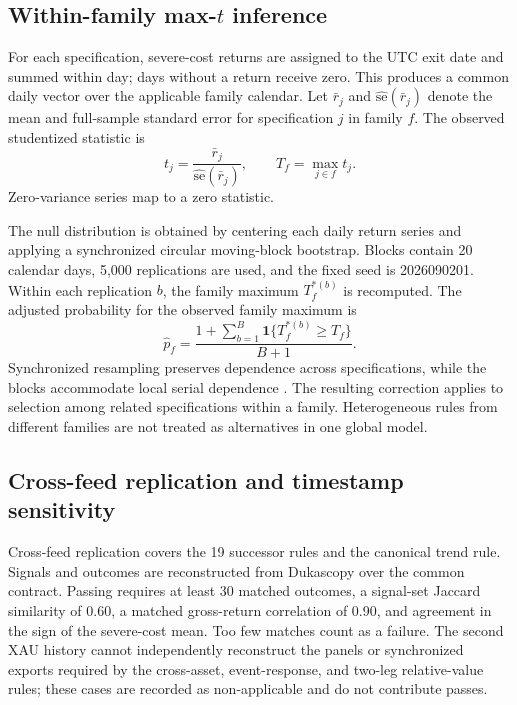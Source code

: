 \subsection{Within-family max-$t$ inference}\label{subsec:maxt}

For each specification, severe-cost returns are assigned to the UTC exit date and summed within day; days without a return receive zero. This produces a common daily vector over the applicable family calendar. Let $\bar r_j$ and $\widehat{\mathrm{se}}(\bar r_j)$ denote the mean and full-sample standard error for specification $j$ in family $f$. The observed studentized statistic is
\begin{equation}
 t_j=\frac{\bar r_j}{\widehat{\mathrm{se}}(\bar r_j)},\qquad
 T_f=\max_{j\in f}t_j.
\end{equation}
Zero-variance series map to a zero statistic.

The null distribution is obtained by centering each daily return series and applying a synchronized circular moving-block bootstrap. Blocks contain 20 calendar days, 5,000 replications are used, and the fixed seed is 2026090201. Within each replication $b$, the family maximum $T_f^{*(b)}$ is recomputed. The adjusted probability for the observed family maximum is
\begin{equation}
 \widehat p_f=\frac{1+\sum_{b=1}^{B}\mathbf{1}\{T_f^{*(b)}\ge T_f\}}{B+1}.
\end{equation}
Synchronized resampling preserves dependence across specifications, while the blocks accommodate local serial dependence \citep{politis1994,romano2005}. The resulting correction applies to selection among related specifications within a family. Heterogeneous rules from different families are not treated as alternatives in one global model.

\subsection{Cross-feed replication and timestamp sensitivity}\label{subsec:replication_methods}

Cross-feed replication covers the 19 successor rules and the canonical trend rule. Signals and outcomes are reconstructed from Dukascopy over the common contract. Passing requires at least 30 matched outcomes, a signal-set Jaccard similarity of 0.60, a matched gross-return correlation of 0.90, and agreement in the sign of the severe-cost mean. Too few matches count as a failure. The second XAU history cannot independently reconstruct the panels or synchronized exports required by the cross-asset, event-response, and two-leg relative-value rules; these cases are recorded as non-applicable and do not contribute passes.

